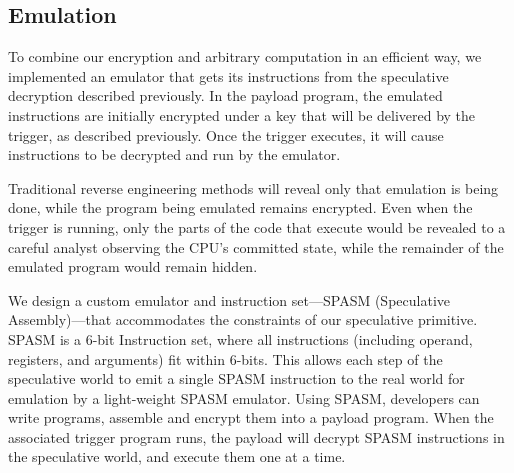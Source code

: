 \FigNestedSpec


\medskip


%
%


% 
% 

\subsection{Emulation}

To combine our encryption and arbitrary computation in an efficient way, we
implemented an emulator that gets its instructions from the speculative
decryption described previously. In the payload program, the emulated
instructions are initially encrypted under a key that will be delivered by the
trigger, as described previously. Once the trigger executes, it will cause
instructions to be decrypted and run by the emulator.

Traditional reverse engineering methods will reveal only that
emulation is being done, while the program being emulated remains encrypted.
Even when the trigger is running, only the parts of the code that execute would
be revealed to a careful analyst observing the CPU's committed state, while the
remainder of the emulated program would remain hidden.

We design a custom emulator and instruction set---SPASM (Speculative
Assembly)---that accommodates the constraints of our speculative primitive.
SPASM is a 6-bit Instruction set, where all instructions (including operand,
registers, and arguments) fit within 6-bits. This allows each step of the
speculative world to emit a single SPASM instruction to the real world for
emulation by a light-weight SPASM emulator. Using SPASM, developers can write
programs, assemble and encrypt them into a payload program. When the
associated trigger program runs, the payload will decrypt SPASM instructions in
the speculative world, and execute them one at a time.


